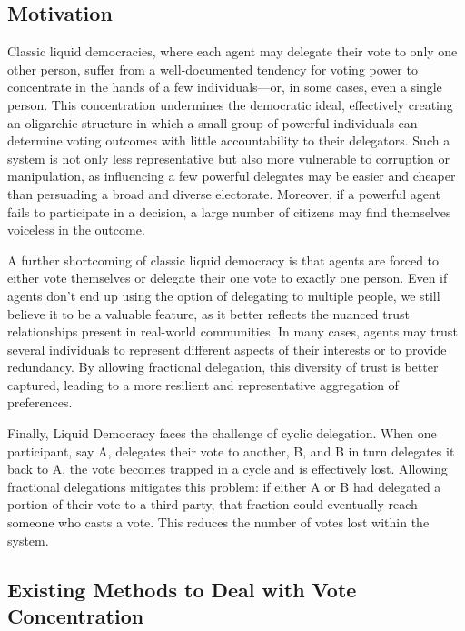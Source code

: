 \subsection{Motivation}

Classic liquid democracies, where each agent may delegate their vote to only one other person, suffer from a well-documented tendency for voting power to concentrate in the hands of a few individuals—or, in some cases, even a single person.  \cite{klingVotingBehaviourPower2015, caragiannisContributionCritiqueLiquid2019, beckerWhenCanLiquid2021}This concentration undermines the democratic ideal, effectively creating an oligarchic structure in which a small group of powerful individuals can determine voting outcomes with little accountability to their delegators. Such a system is not only less representative but also more vulnerable to corruption or manipulation, as influencing a few powerful delegates may be easier and cheaper than persuading a broad and diverse electorate. Moreover, if a powerful agent fails to participate in a decision, a large number of citizens may find themselves voiceless in the outcome.

A further shortcoming of classic liquid democracy is that agents are forced to either vote themselves or delegate their one vote to exactly one person. Even if agents don't end up using the option of delegating to multiple people, we still believe it to be a valuable feature, as it better reflects the nuanced trust relationships present in real-world communities. In many cases, agents may trust several individuals to represent different aspects of their interests or to provide redundancy. By allowing fractional delegation, this diversity of trust is better captured, leading to a more resilient and representative aggregation of preferences. 

Finally, Liquid Democracy faces the challenge of cyclic delegation. When one participant, say A, delegates their vote to another, B, and B in turn delegates it back to A, the vote becomes trapped in a cycle and is effectively lost. \cite{behrensCircularDelegationsMyth2015} Allowing fractional delegations mitigates this problem: if either A or B had delegated a portion of their vote to a third party, that fraction could eventually reach someone who casts a vote. This reduces the number of votes lost within the system.

\subsection{Existing Methods to Deal with Vote Concentration}

